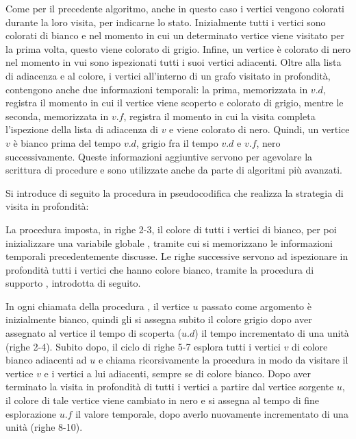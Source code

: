 Come per il precedente algoritmo, anche in questo caso i vertici vengono colorati durante la loro visita, per indicarne lo stato. Inizialmente tutti i vertici sono colorati di bianco e nel momento in cui un determinato vertice viene visitato per la prima volta, questo viene colorato di grigio. Infine, un vertice è colorato di nero nel momento in vui sono ispezionati tutti i suoi vertici adiacenti. Oltre alla lista di adiacenza e al colore, i vertici all'interno di un grafo visitato in profondità, contengono anche due informazioni temporali: la prima, memorizzata in \(v.d\), registra il momento in cui il vertice viene scoperto e colorato di grigio, mentre le seconda, memorizzata in \(v.f\), registra il momento in cui la visita completa l'ispezione della lista di adiacenza di \(v\) e viene colorato di nero. Quindi, un vertice \(v\) è bianco prima del tempo \(v.d\), grigio fra il tempo \(v.d\) e \(v.f\), nero successivamente. Queste informazioni aggiuntive servono per agevolare la scrittura di procedure e sono utilizzate anche da parte di algoritmi più avanzati. 

Si introduce di seguito la procedura in pseudocodifica che realizza la strategia di visita in profondità:



La procedura imposta, in righe 2-3, il colore di tutti i vertici di bianco, per poi inizializzare una variabile globale , tramite cui si memorizzano le informazioni temporali precedentemente discusse. Le righe successive servono ad ispezionare in profondità tutti i vertici che hanno colore bianco, tramite la procedura di supporto , introdotta di seguito.



In ogni chiamata della procedura , il vertice \(u\) passato come argomento è inizialmente bianco, quindi gli si assegna subito il colore grigio dopo aver assegnato al vertice il tempo di scoperta (\(u.d\)) il tempo incrementato di una unità (righe 2-4). Subito dopo, il ciclo  di righe 5-7 esplora tutti i vertici \(v\) di colore bianco adiacenti ad \(u\) e chiama ricorsivamente la procedura in modo da visitare il vertice \(v\) e i vertici a lui adiacenti, sempre se di colore bianco. Dopo aver terminato la visita in profondità di tutti i vertici a partire dal vertice sorgente \(u\), il colore di tale vertice viene cambiato in nero e si assegna al tempo di fine esplorazione \(u.f\) il valore temporale, dopo averlo nuovamente incrementato di una unità (righe 8-10).

